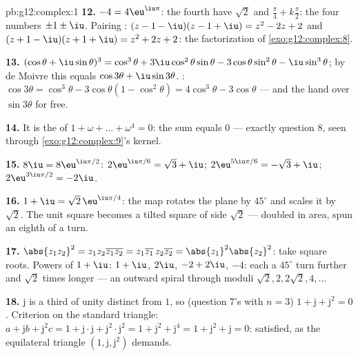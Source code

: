 \begin{solution}{pb:g12:complex:1}
\textbf{12.} $-4 = 4\eu^{\iu\pi}$: the fourth  have
 $\sqrt2$ and 
$\frac{\pi}{4} + k\frac{\pi}{2}$: the four numbers
$\pm 1 \pm \iu$. Pairing :
$(z - 1 - \iu)(z - 1 + \iu) = z^2 - 2z + 2$ and
$(z + 1 - \iu)(z + 1 + \iu) = z^2 + 2z + 2$: the
factorization of \cref{exo:g12:complex:8}.

\textbf{13.} $(\cos\theta + \iu\sin\theta)^3 = \cos^3\theta +
3\iu\cos^2\theta\sin\theta - 3\cos\theta\sin^2\theta -
\iu\sin^3\theta$; by de Moivre this equals
$\cos 3\theta + \iu \sin 3\theta$. :
$\cos 3\theta = \cos^3\theta - 3\cos\theta(1 - \cos^2\theta)
= 4\cos^3\theta - 3\cos\theta$ --- and the 
hand over $\sin 3\theta$ for free.

\textbf{14.} It is the  of
$1 + \omega + \dots + \omega^4 = 0$: the sum equals $0$ ---
exactly question 8, seen through
\cref{exo:g12:complex:9}'s kernel.

\textbf{15.} $8\iu = 8\eu^{\iu\pi/2}$: 
$2\eu^{\iu\pi/6} = \sqrt3 + \iu$;
$2\eu^{5\iu\pi/6} = -\sqrt3 + \iu$;
$2\eu^{3\iu\pi/2} = -2\iu$.

\textbf{16.} $1 + \iu = \sqrt2\,\eu^{\iu\pi/4}$: the map
rotates the plane by $45^\circ$ and scales it by $\sqrt2$. The
unit square becomes a tilted square of side $\sqrt2$ ---
doubled in area, spun an eighth of a turn.

\textbf{17.} $\abs{z_1 z_2}^2 = z_1 z_2 \overline{z_1 z_2} =
z_1\overline{z_1}\, z_2\overline{z_2} =
\abs{z_1}^2\abs{z_2}^2$: take square roots. Powers of
$1 + \iu$: $1 + \iu$, $2\iu$, $-2 + 2\iu$, $-4$: each a
$45^\circ$ turn further and $\sqrt2$ times longer --- an
outward spiral through moduli
$\sqrt2, 2, 2\sqrt2, 4, \dots$

\textbf{18.} $\mathrm{j}$ is a third  of unity
distinct from $1$, so (question 7's  with $n = 3$)
$1 + \mathrm{j} + \mathrm{j}^2 = 0$. Criterion on the standard
triangle: $a + \mathrm{j}b + \mathrm{j}^2 c = 1 +
\mathrm{j}\cdot\mathrm{j} + \mathrm{j}^2 \cdot \mathrm{j}^2 =
1 + \mathrm{j}^2 + \mathrm{j}^4 = 1 + \mathrm{j}^2 +
\mathrm{j} = 0$: satisfied, as the equilateral triangle
$\left(1, \mathrm{j}, \mathrm{j}^2\right)$ demands.


\end{solution}
